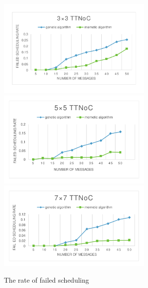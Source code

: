 \documentclass[journal]{IEEEtran}
\begin{document}
\begin{figure}[!t]
	\centering
	\includegraphics[width=3in]{picture/33TTNOC}
		\includegraphics[width=3in]{picture/55TTNOC}
			\includegraphics[width=3in]{picture/77TTNOC}
	\caption{The rate of failed scheduling}
	\label{f:fail}
\end{figure}
\end{document}
